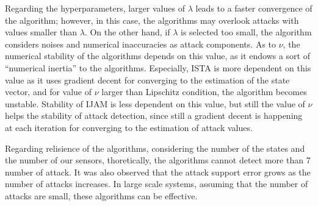 Regarding the hyperparameters, larger values of $\lambda$ leads to a faster convergence of the algorithm; however, in this case, the algorithms may overlook attacks with values smaller than $\lambda$. On the other hand, if $\lambda$ is selected too small, the algorithm considers noises and numerical inaccuracies as attack components. As to $\nu$, the numerical stability of the algorithms depends on this value, as it endows a sort of ``numerical inertia'' to the algorithms. Especially, ISTA is more dependent on this value as it uses gradient decent for converging to the estimation of the state vector, and for value of $\nu$ larger than Lipschitz condition, the algorithm becomes unstable. Stability of IJAM is less dependent on this value, but still the value of $\nu$ helps the stability of attack detection, since still a gradient decent is happening at each iteration for converging to the estimation of attack values.
 
Regarding relisience of the algorithms, considering the number of the states and the number of our sensors, thoretically, the algorithms cannot detect more than 7 number of attack. It was also observed that the attack support error grows as the number of attacks increases. In large scale systems, assuming that the number of attacks are small, these algorithms can be effective.
 
 











